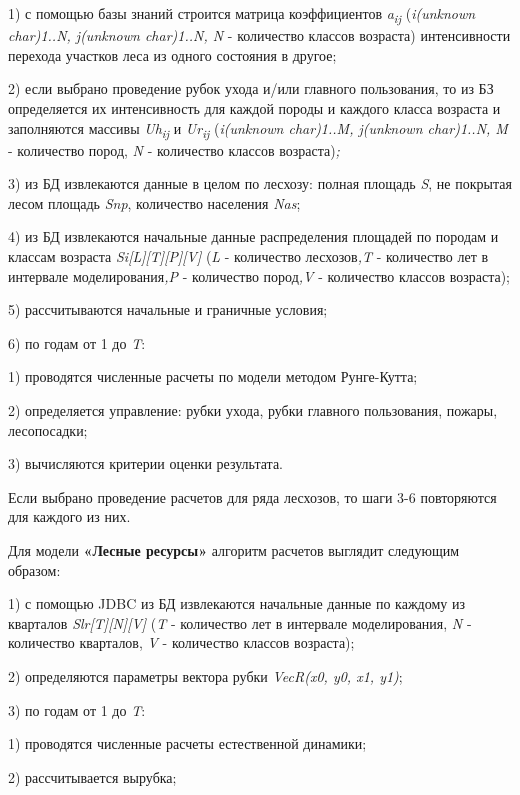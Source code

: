 \documentclass{article}
\begin{document}
1) с помощью базы знаний строится матрица коэффициентов 
\textit{a}\textsubscript{\textit{ij}}\textit{ }(\textit{i(unknown char)1..N, j(unknown char)1..N, 
N} - количество классов возраста) интенсивности 
перехода участков леса из одного состояния 
в другое;

2) если выбрано проведение рубок ухода и/или 
главного пользования, то из БЗ определяется 
их интенсивность для каждой породы и каждого 
класса возраста и заполняются массивы \textit{Uh}\textsubscript{\textit{ij 
}}и\textit{ Ur}\textsubscript{\textit{ij}}\textit{ }(\textit{i(unknown char)1..M, 
j(unknown char)1..N, M} - количество пород, \textit{N} - количество 
классов возраста)\textit{;}

3) из БД извлекаются данные в целом по лесхозу: 
полная площадь \textit{S}, не покрытая лесом площадь 
\textit{Snp}, количество населения \textit{Nas};

4) из БД извлекаются начальные данные распределения 
площадей по породам и классам возраста \textit{Si[L][T][P][V] 
}(\textit{L} - количество лесхозов\textit{,T} - количество 
лет в интервале моделирования\textit{,P} - количество 
пород\textit{,V} - количество классов возраста);

5) рассчитываются начальные и граничные условия;

6) по годам от 1 до \textit{T}:

1) проводятся численные расчеты по модели методом 
Рунге-Кутта;

2) определяется управление: рубки ухода, рубки 
главного пользования, пожары, лесопосадки;

3) вычисляются критерии оценки результата.

Если выбрано проведение расчетов для ряда лесхозов, 
то шаги 3-6 повторяются для каждого из них.

Для модели \textbf{«Лесные ресурсы»} алгоритм расчетов 
выглядит следующим образом:

1) с помощью JDBC из БД извлекаются начальные данные 
по каждому из кварталов \textit{Slr[T][N][V]} (\textit{T} - 
количество лет в интервале моделирования, \textit{N} 
- количество кварталов, \textit{V} - количество классов 
возраста);

2) определяются параметры вектора рубки \textit{VecR(x0, 
y0, x1, y1)};

3) по годам от 1 до \textit{T}:

1) проводятся численные расчеты естественной 
динамики;

2) рассчитывается вырубка;
\end{document}
